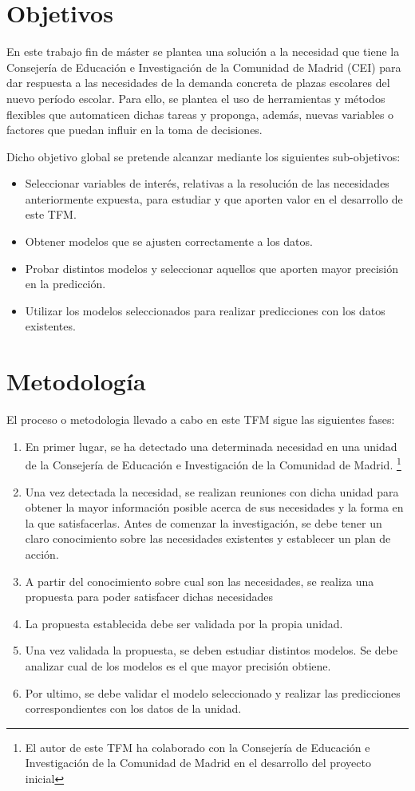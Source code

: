 \section{Objetivos}
En este trabajo fin de máster se plantea una solución a la necesidad que tiene la Consejería de Educación e Investigación de la Comunidad de Madrid (CEI) para dar respuesta a las necesidades de la demanda concreta de plazas escolares del nuevo período escolar. Para ello, se plantea el uso de herramientas y métodos flexibles que automaticen dichas tareas y proponga, además, nuevas variables o factores que puedan influir en la toma de decisiones. 

Dicho objetivo global se pretende alcanzar mediante los siguientes sub-objetivos:
\begin{itemize}
	\item Seleccionar variables de interés, relativas a la resolución de las necesidades anteriormente expuesta, para estudiar y que aporten valor en el desarrollo de este TFM.
	\item Obtener modelos que se ajusten correctamente a los datos.
	\item Probar distintos modelos y seleccionar aquellos que aporten mayor precisión en la predicción. 
	\item Utilizar los modelos seleccionados para realizar predicciones con los datos existentes. 
\end{itemize}

\section{Metodología}
El proceso o metodologia llevado a cabo en este TFM sigue las siguientes fases:
\begin{enumerate}
	\item En primer lugar, se ha detectado una determinada necesidad en una unidad de la Consejería de Educación e Investigación de la Comunidad de Madrid. \footnote{El autor de este TFM ha colaborado con la Consejería de Educación e Investigación de la Comunidad de Madrid en el desarrollo del proyecto inicial} 
	\item Una vez detectada la necesidad, se realizan reuniones con dicha unidad para obtener la mayor información posible acerca de sus necesidades y la forma en la que satisfacerlas. Antes de comenzar la investigación, se debe tener un claro conocimiento sobre las necesidades existentes y establecer un plan de acción.
	\item A partir del conocimiento sobre cual son las necesidades, se realiza una propuesta para poder satisfacer dichas necesidades
	\item La propuesta establecida debe ser validada por la propia unidad.
	\item Una vez validada la propuesta, se deben estudiar distintos modelos. Se debe analizar cual de los modelos es el que mayor precisión obtiene.
	\item Por ultimo, se debe validar el modelo seleccionado y realizar las predicciones correspondientes con los datos de la unidad.
\end{enumerate}

